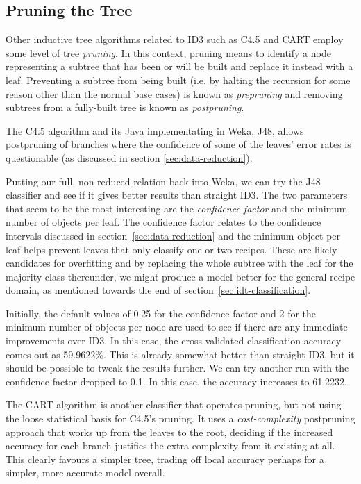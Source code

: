 \documentclass[11pt,a4paper]{article}
\begin{document}
\subsection{Pruning the Tree}
\label{sec:pruning}

Other inductive tree algorithms related to ID3 such as C4.5 and CART employ some
level of tree \emph{pruning}. In this context, pruning means to identify a node
representing a subtree that has been or will be built and replace it instead with
a leaf. Preventing a subtree
from being built (i.e. by halting the recursion for some reason other than 
the normal base cases) is known as \emph{prepruning} and removing subtrees from
a fully-built tree is known as \emph{postpruning}.

The C4.5 algorithm and its Java implementating in Weka, J48, allows postpruning
of branches where the confidence of some of the leaves' error rates is questionable
(as discussed in section \ref{sec:data-reduction}).

Putting our full, non-reduced relation back into Weka, we can try the J48
classifier and see if it gives better results than straight ID3. The two parameters
that seem to be the most interesting are the \emph{confidence factor} and the
minimum number of objects per leaf. The confidence factor relates to the
confidence intervals discussed in section~\ref{sec:data-reduction} and
the minimum object per leaf helps prevent leaves that only classify one or two
recipes. These are likely candidates for overfitting and by replacing the whole
subtree with the leaf for the majority class thereunder, we might produce a model
better for the general recipe domain, as mentioned towards the end of
section~\ref{sec:idt-classification}.

Initially, the default values of 0.25 for the confidence factor and 2 for the minimum
number of objects per node are used to see if there are any immediate improvements
over ID3. In this case, the cross-validated classification accuracy comes out
as 59.9622\%. This is already somewhat better than straight ID3, but it should be possible to
tweak the results further. We can try another run with the confidence factor dropped
to 0.1. In this case, the accuracy increases to 61.2232.

The CART algorithm is another classifier that operates pruning, but not using
the loose statistical basis for C4.5's pruning. It uses a \emph{cost-complexity}
postpruning approach that works up from the leaves to the root, deciding if
the increased accuracy for each branch justifies the extra complexity from it
existing at all. This clearly favours a simpler tree, trading off local accuracy
perhaps for a simpler, more accurate model overall.
\end{document}
